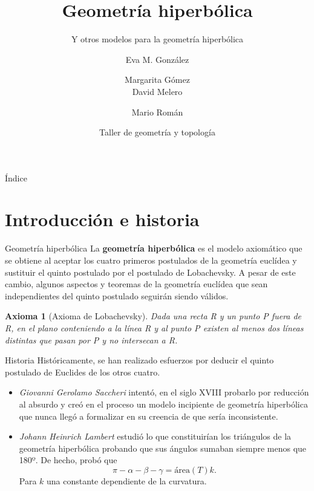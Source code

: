\documentclass[compress]{beamer}
\title{Geometría hiperbólica}                                               %
\subtitle{Y otros modelos para la geometría hiperbólica}                                  %
\author[UGR]{ %
Eva M. González \and Margarita Gómez  \\ David Melero \and Mario Román \texorpdfstring{\\
\href{}{}}{}} %
\date{Taller de geometría y topología}                                                            %
\newtheorem*{axiom}{Axioma}
\begin{document}
\begin{frame}
\titlepage
\end{frame}

\begin{frame}{Índice}
  \hypertarget{index}{}
  \tableofcontents
\end{frame}

\section{Introducción e historia}
\begin{frame}{Geometría hiperbólica}
  La \textbf{geometría hiperbólica} es el modelo axiomático que se
  obtiene al aceptar los cuatro primeros postulados de la geometría
  euclídea y sustituir el quinto postulado por el postulado de
  Lobachevsky. A pesar de este cambio, algunos aspectos y teoremas
  de la geometría euclídea que sean independientes del quinto postulado
  seguirán siendo válidos.
  
  \pause
  
  \begin{axiom}[Axioma de Lobachevsky]
    Dada una recta R y un punto P fuera de R, en el plano conteniendo a
    la línea R y al punto P existen al menos dos líneas distintas que pasan
    por P y no intersecan a R.
  \end{axiom}
\end{frame}

\begin{frame}{Historia}
  Históricamente, se han realizado esfuerzos por deducir el quinto
  postulado de Euclides de los otros cuatro.

  \begin{itemize}
  \item\textit{Giovanni Gerolamo Saccheri} intentó, en el siglo XVIII
    probarlo por reducción al absurdo y creó en el proceso un modelo
    incipiente de geometría hiperbólica que nunca llegó a formalizar
    en su creencia de que sería inconsistente.
  \item\textit{Johann Heinrich Lambert} estudió lo que constituirían
    los triángulos de la geometría hiperbólica probando que sus
    ángulos sumaban siempre menos que 180º. De hecho, probó que
    \[
      \pi - \alpha- \beta - \gamma = \mathrm{área}(T)k.
    \]
    Para $k$ una constante dependiente de la curvatura.
  \end{itemize}
\end{frame}
\end{document}

